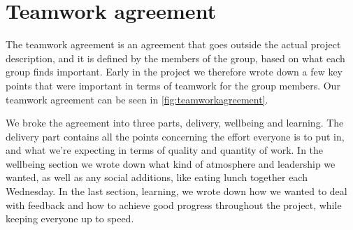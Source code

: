 \section{Teamwork agreement}
The teamwork agreement is an agreement that goes outside the actual project description, and it is defined by the members of the group, based on what each group finds important. Early in the project we therefore wrote down a few key points that were important in terms of teamwork for the group members. Our teamwork agreement can be seen in \autoref{fig:teamworkagreement}. 

We broke the agreement into three parts, delivery, wellbeing and learning. The delivery part contains all the points concerning the effort everyone is to put in, and what we're expecting in terms of quality and quantity of work. In the wellbeing section we wrote down what kind of atmosphere and leadership we wanted, as well as any social additions, like eating lunch together each Wednesday. In the last section, learning, we wrote down how we wanted to deal with feedback and how to achieve good progress throughout the project, while keeping everyone up to speed.
